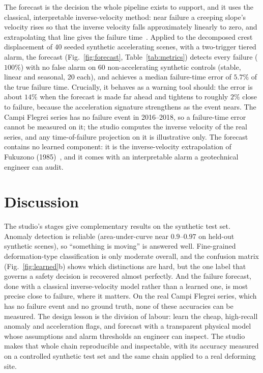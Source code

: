 \documentclass[journal]{IEEEtran}
\begin{document}
The forecast is the decision the whole pipeline exists to support, and it uses the classical, interpretable
inverse-velocity method: near failure a creeping slope's velocity rises so that the inverse velocity falls
approximately linearly to zero, and extrapolating that line gives the failure time~\cite{fukuzono}. Applied to
the decomposed crest displacement of 40 seeded synthetic accelerating scenes, with a two-trigger tiered alarm, the
forecast (Fig.~\ref{fig:forecast}, Table~\ref{tab:metrics}) detects every failure ($100\%$) with no false alarm
on 60 non-accelerating synthetic controls (stable, linear and seasonal, 20 each), and achieves a median
failure-time error of $5.7\%$ of the true failure time. Crucially, it behaves as a warning tool should: the
error is about $14\%$ when the forecast is made far ahead and tightens to roughly $2\%$ close to failure, because
the acceleration signature strengthens as the event nears. The Campi Flegrei series has no failure event in
2016--2018, so a failure-time error cannot be measured on it; the studio computes the inverse velocity of the
real series, and any time-of-failure projection on it is illustrative only. The forecast contains no learned
component: it is the inverse-velocity extrapolation of Fukuzono (1985)~\cite{fukuzono}, and it comes with an
interpretable alarm a geotechnical engineer can audit.

\section{Discussion}\label{sec:discuss}

The studio's stages give complementary results on the synthetic test set. Anomaly detection is reliable
(area-under-curve near $0.9$--$0.97$ on held-out synthetic scenes), so ``something is moving'' is answered well.
Fine-grained deformation-type classification is only moderate overall, and the confusion matrix
(Fig.~\ref{fig:learned}b) shows which distinctions are hard, but the one label that governs a safety decision is
recovered almost perfectly. And the failure forecast, done with a classical inverse-velocity model rather than a
learned one, is most precise close to failure, where it matters. On the real Campi Flegrei series, which has no
failure event and no ground truth, none of these accuracies can be measured. The design lesson is the division
of labour: learn the cheap, high-recall anomaly and acceleration flags, and forecast with a transparent physical
model whose assumptions and alarm thresholds an engineer can inspect. The studio makes that whole chain
reproducible and inspectable, with its accuracy measured on a controlled synthetic test set and the same chain
applied to a real deforming site.
\end{document}
